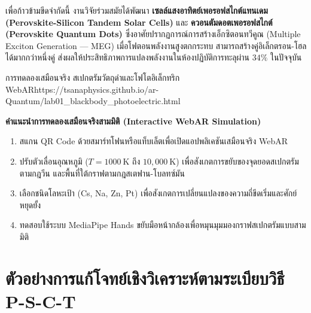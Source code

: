 เพื่อก้าวข้ามขีดจำกัดนี้ งานวิจัยร่วมสมัยได้พัฒนา \textbf{เซลล์แสงอาทิตย์เพอรอฟสไกต์แทนเดม (Perovskite-Silicon Tandem Solar Cells)} และ \textbf{ควอนตัมดอตเพอรอฟสไกต์ (Perovskite Quantum Dots)} ซึ่งอาศัยปรากฏการณ์การสร้างเอ็กซิตอนทวีคูณ (Multiple Exciton Generation --- MEG) เมื่อโฟตอนพลังงานสูงตกกระทบ สามารถสร้างคู่อิเล็กตรอน-โฮลได้มากกว่าหนึ่งคู่ ส่งผลให้ประสิทธิภาพการแปลงพลังงานในห้องปฏิบัติการทะลุผ่าน $34\%$ ในปัจจุบัน

\begin{qrcodelabbox}{การทดลองเสมือนจริง สเปกตรัมวัตถุดำและโฟโตอิเล็กทริก WebAR}{https://tsanaphysics.github.io/ar-Quantum/lab01_blackbody_photoelectric.html}
\begin{minipage}[c]{0.70\textwidth}
\textbf{คำแนะนำการทดลองเสมือนจริงสามมิติ (Interactive WebAR Simulation)}
\begin{enumerate}
    \item สแกน QR Code ด้วยสมาร์ทโฟนหรือแท็บเล็ตเพื่อเปิดแอปพลิเคชันเสมือนจริง WebAR
    \item ปรับตัวเลื่อนอุณหภูมิ ($T = 1000~\text{K}$ ถึง $10{,}000~\text{K}$) เพื่อสังเกตการขยับของจุดยอดสเปกตรัมตามกฎวีน และพื้นที่ใต้กราฟตามกฎสเตฟาน-โบลทซ์มัน
    \item เลือกชนิดโลหะเป้า (Cs, Na, Zn, Pt) เพื่อสังเกตการเปลี่ยนแปลงของความถี่ขีดเริ่มและศักย์หยุดยั้ง
    \item ทดสอบใช้ระบบ MediaPipe Hands ขยับมือหน้ากล้องเพื่อหมุนมุมมองกราฟสเปกตรัมแบบสามมิติ
\end{enumerate}
\end{minipage}
\hfill
\begin{minipage}[c]{0.25\textwidth}
\centering
{}
\end{minipage}
\end{qrcodelabbox}

\section{ตัวอย่างการแก้โจทย์เชิงวิเคราะห์ตามระเบียบวิธี P-S-C-T}

